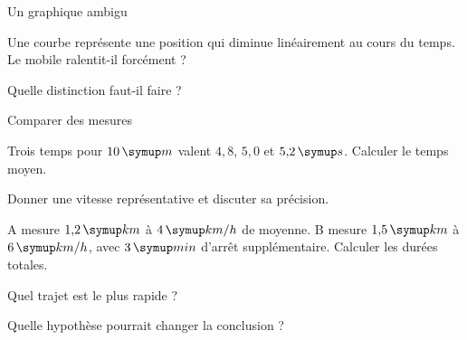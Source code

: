 \par\noindent\begin{minipage}{\linewidth}
\begin{exercice}[3]{Un graphique ambigu}
\begin{questions}
\item Une courbe représente une position qui diminue linéairement au cours du temps. Le mobile ralentit-il forcément ?
\item Quelle distinction faut-il faire ?
\end{questions}
\end{exercice}
\end{minipage}
\par\noindent\begin{minipage}{\linewidth}
\begin{exercice}[3]{Comparer des mesures}
\begin{questions}
\item Trois temps pour $10\unite m$ valent $4{,}8$, $5{,}0$ et $5{,}2\unite s$. Calculer le temps moyen.
\item Donner une vitesse représentative et discuter sa précision.
\end{questions}
\end{exercice}
\end{minipage}
\label{defi-ex-9}
\begin{questions}
\item A mesure $1{,}2\unite{km}$ à $4\unite{km/h}$ de moyenne. B mesure $1{,}5\unite{km}$ à $6\unite{km/h}$, avec $3\unite{min}$ d’arrêt supplémentaire. Calculer les durées totales.
\item Quel trajet est le plus rapide ?
\item Quelle hypothèse pourrait changer la conclusion ?
\end{questions}
\pcGrille
